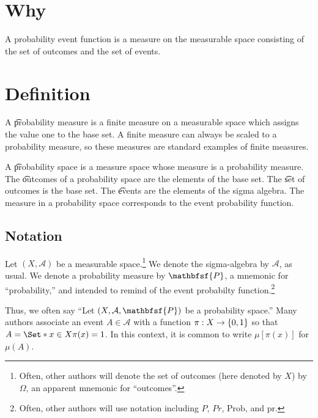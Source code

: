 
\section*{Why}

A probability event function is a measure on the measurable space consisting of the set of outcomes and the set of events.

\section*{Definition}

A \t{probability measure} is a finite measure on a measurable space which assigns the value one to the base set.
A finite measure can always be scaled to a probability measure, so these measures are standard examples of finite measures.

A \t{probability space} is a measure space whose measure is a probability measure.
The \t{outcomes} of a probability space are the elements of the base set.
The \t{set of outcomes} is the base set.
The \t{events} are the elements of the sigma algebra.
The measure in a probability space corresponds to the event probability function.

\subsection*{Notation}

Let $(X, \mathcal{A} )$ be a measurable space.\footnote{Often, other authors will denote the set of outcomes (here denoted by $X$) by $\Omega $, an apparent mnemonic for ``outcomes''.}
We denote the sigma-algebra by $\mathcal{A} $, as usual.
We denote a probability measure by $\mathbfsf{P} $, a mnemonic for ``probability,'' and intended to remind of the event probabilty function.\footnote{Often, other authors will use notation including $P$, $Pr$, $\text{Prob}$, and $\text{pr}$.}

Thus, we often say ``Let $(X, \mathcal{A} , \mathbfsf{P} )$ be a probability space.''
Many authors associate an event $A \in \mathcal{A} $ with a function $\pi : X \to \{0, 1\}$ so that $A = \Set*{x \in X}{\pi (x) = 1}$.
In this context, it is common to write $\mu [\pi (x)]$ for $\mu (A)$.

\blankpage
